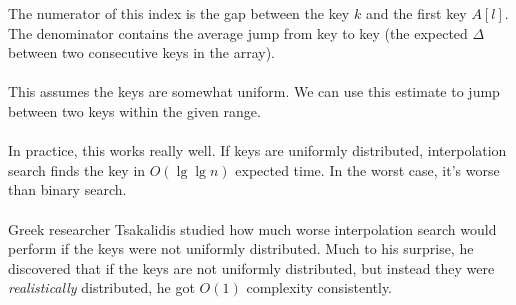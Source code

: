 \documentclass[]{article}
\theoremstyle{definition}
\begin{document}
			The numerator of this index is the gap between the key $k$ and the first key $A[l]$. The denominator contains the average jump from key to key (the expected $\Delta$ between two consecutive keys in the array).
			\\ \\
			This assumes the keys are somewhat uniform. We can use this estimate to jump between two keys within the given range.
			\\ \\
			In practice, this works really well. If keys are uniformly distributed, interpolation search finds the key in $O(\lg \lg n)$ expected time. In the worst case, it's worse than binary search.
			\\ \\
			Greek researcher Tsakalidis studied how much worse interpolation search would perform if the keys were not uniformly distributed. Much to his surprise, he discovered that if the keys are not uniformly distributed, but instead they were \emph{realistically} distributed, he got $O(1)$ complexity consistently. 
\end{document}
